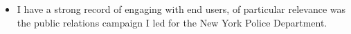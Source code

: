 
\begin{itemize}
    \item {} I have a strong record of engaging with end users, of particular relevance was the public relations campaign I led for the New York Police Department.
\end{itemize}